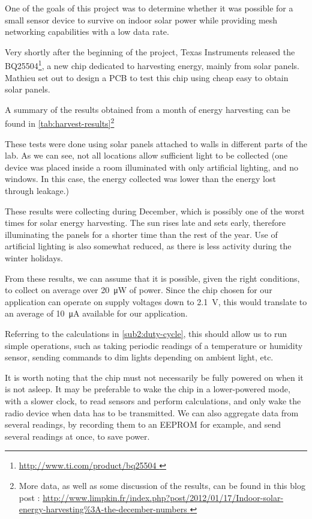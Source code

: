 One of the goals of this project was to determine whether it was possible for
a small sensor device to survive on indoor solar power while providing mesh
networking capabilities with a low data rate. 

Very shortly after the beginning of the project, Texas Instruments released
the BQ25504\footnote{ \url{ http://www.ti.com/product/bq25504 }}, a new chip
dedicated to harvesting energy, mainly from solar panels. Mathieu set out to
design a PCB to test this chip using cheap easy to obtain solar panels.

A summary of the results obtained from a month of energy harvesting can be found
in \autoref{tab:harvest-results}\footnote{ More data, as well as some discussion
of the results, can be found in this blog post : \url{
http://www.limpkin.fr/index.php?post/2012/01/17/Indoor-solar-energy-harvesting\%3A-the-december-numbers
}}

These tests were done using solar panels attached to walls in different parts of
the lab. As we can see, not all locations allow sufficient light to be
collected (one device was placed inside a room illuminated with only artificial
lighting, and no windows. In this case, the energy collected was lower than the
energy lost through leakage.)

These results were collecting during December, which is possibly one of the
worst times for solar energy harvesting. The sun rises late and sets early,
therefore illuminating the panels for a shorter time than the rest of the year.
Use of artificial lighting is also somewhat reduced, as there is less activity
during the winter holidays.

From these results, we can assume that it is possible, given the right
conditions, to collect on average over \SI{20}{\micro\watt} of power. Since the
chip chosen for our application can operate on supply voltages down to
\SI{2.1}{V}, this would translate to an average of \SI{10}{\micro\ampere}
available for our application.

Referring to the calculations in \autoref{sub2:duty-cycle}, this should allow us
to run simple operations, such as taking periodic readings of a temperature or
humidity sensor, sending commands to dim lights depending on ambient light, etc. 

It is worth noting that the chip must not necessarily be fully powered on when
it is not asleep. It may be preferable to wake the chip in a lower-powered mode,
with a slower clock, to read sensors and perform calculations, and only wake the
radio device when data has to be transmitted. We can also aggregate data from
several readings, by recording them to an EEPROM for example, and send several
readings at once, to save power.

